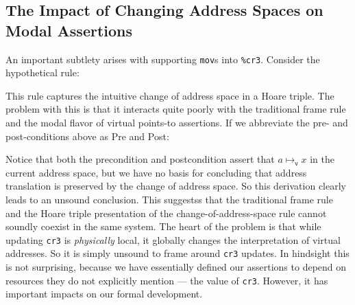 \subsection{The Impact of Changing Address Spaces on Modal Assertions}
\label{sec:issues}
An important subtlety arises with supporting \lstinline|mov|s into \lstinline|%cr3|. Consider the hypothetical rule:
\begin{mathpar}
\end{mathpar}
This rule captures the intuitive change of address space in a Hoare triple.
The problem with this is that it interacts quite poorly with the traditional frame
rule and the modal flavor of virtual points-to assertions.
If we abbreviate the pre- and post-conditions above as \textsf{Pre} and \textsf{Post}:
\begin{mathpar}
\end{mathpar}
Notice that both the precondition and postcondition assert that $a\mapsto_\mathsf{v} x$ in the current address space, but we have no basis for concluding that address translation is preserved by the change of address space. So this derivation clearly leads to an unsound conclusion. 
This suggestss that the traditional frame rule and the Hoare triple presentation of the change-of-address-space rule cannot soundly coexist in the same system.
The heart of the problem is that while updating \lstinline|cr3| is \emph{physically} local, it globally changes the interpretation of virtual addresses. So it is simply unsound to frame around \lstinline|cr3| updates.
In hindsight this is not surprising, because we have essentially defined
our assertions to depend on resources they do not explicitly mention --- the value of \lstinline|cr3|.
However, it has important impacts on our formal development.


